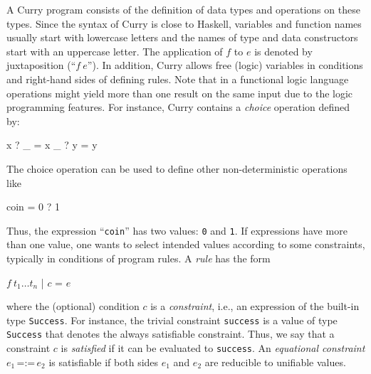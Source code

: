\documentclass[english]{lni}
\newcommand{\code}[1]{\texttt{#1}}
\newcommand{\ccode}[1]{``\code{#1}''}
\begin{document}
A Curry program consists of the definition of data types and
operations on these types. 
Since the syntax of Curry is close to Haskell,
variables and function names usually
start with lowercase letters and the names of type and data constructors
start with an uppercase letter. The application of $f$
to $e$ is denoted by juxtaposition (``$f~e$'').
In addition, Curry allows free (logic) 
variables in conditions and right-hand sides of defining rules.
Note that in a functional logic language
operations might yield more than one result on the same input due to 
the logic programming features.
For instance, Curry contains a \emph{choice} operation defined by:
%
\begin{curry}
x ? _ = x
_ ? y = y
\end{curry}
%
The choice operation can be used to define other non-deterministic operations
like
%
\begin{curry}
coin = 0 ? 1  
\end{curry}
Thus, the expression \ccode{coin} has two values: \code{0} and \code{1}.
If expressions have more than one value, one wants to select
intended values according to some constraints,
typically in conditions of program rules.
A \emph{rule} has the form
\begin{curry}
$f~t_1\ldots{}t_n$ | $c$ = $e$
\end{curry}
where the (optional) condition $c$ is a \emph{constraint},
i.e., an expression of the built-in type
\code{Success}. For instance, the trivial constraint
\code{success} is a value of type \code{Success} that
denotes the always satisfiable constraint.
Thus, we say that a constraint $c$ is \emph{satisfied} if it
can be evaluated to \code{success}.
An \emph{equational constraint} $e_1 \,\code{=:=}\, e_2$ is satisfiable
if both sides $e_1$ and $e_2$ are reducible to unifiable values.
\end{document}

